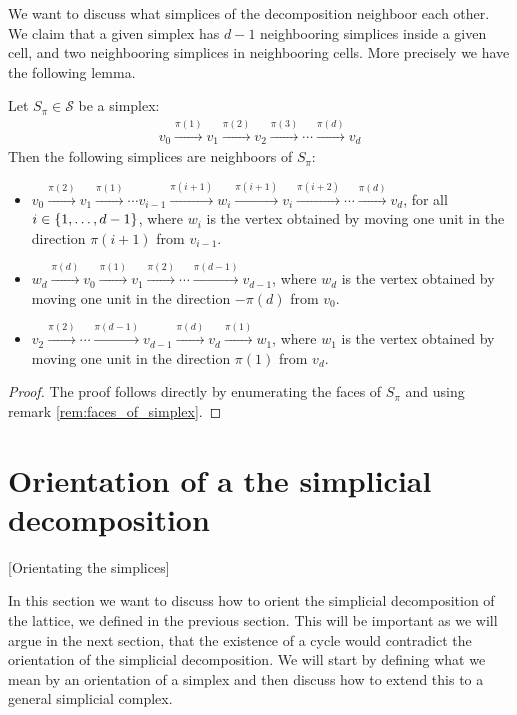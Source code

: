 We want to discuss what simplices of the decomposition neighboor each other. We claim that a given simplex has $d-1$ neighbooring simplices inside a given cell, and two neighbooring simplices in neighbooring cells. More precisely we have the following lemma.

\begin{lemma}
    Let $S_{\pi} \in \mathcal{S}$ be a simplex:
    \begin{align*}
        v_0 \xrightarrow{\pi(1)} v_1 \xrightarrow{\pi(2)} v_2 \xrightarrow{\pi(3)} \cdots \xrightarrow{\pi(d)} v_d
    \end{align*}
    Then the following simplices are neighboors of $S_{\pi}$:
    \begin{itemize}
        \item $v_0 \xrightarrow{\pi(2)} v_1 \xrightarrow{\pi(1)} \cdots v_{i-1} \xrightarrow{\pi(i+1)} w_i \xrightarrow{\pi(i+1)} v_{i} \xrightarrow{\pi(i+2)} \cdots \xrightarrow{\pi(d)} v_d$, for all $i \in \left\{1, \dots, d-1\right\}$, where $w_i$ is the vertex obtained by moving one unit in the direction $\pi(i+1)$ from $v_{i-1}$.
        \item $w_d \xrightarrow{\pi(d)} v_0 \xrightarrow{\pi(1)} v_1 \xrightarrow{\pi(2)} \cdots \xrightarrow{\pi(d-1)} v_{d-1}$, where $w_d$ is the vertex obtained by moving one unit in the direction $-\pi(d)$ from $v_{0}$.
        \item $v_2 \xrightarrow{\pi(2)} \cdots \xrightarrow{\pi(d-1)} v_{d-1} \xrightarrow{\pi(d)} v_d \xrightarrow{\pi(1)} w_1$, where $w_1$ is the vertex obtained by moving one unit in the direction $\pi(1)$ from $v_d$.
    \end{itemize}
\end{lemma}
\begin{proof}
    The proof follows directly by enumerating the faces of $S_{\pi}$ and using remark \ref{rem:faces_of_simplex}.
\end{proof}

\section{Orientation of a the simplicial decomposition}[Orientating the simplices]

In this section we want to discuss how to orient the simplicial decomposition of the lattice, we defined in the previous section. This will be important as we will argue in the next section, that the existence of a cycle would contradict the orientation of the simplicial decomposition. We will start by defining what we mean by an orientation of a simplex and then discuss how to extend this to a general simplicial complex.

